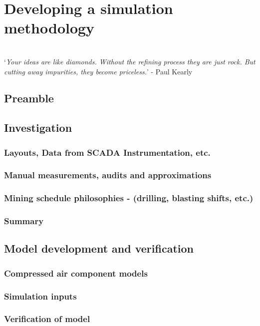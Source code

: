 \chapter{Developing a simulation methodology}
\vspace{38em}

\hrulefill
\\
\enquote*{\textit{Your ideas are like diamonds. Without the refining process they are just rock. But cutting away impurities, they become priceless.}} - Paul Kearly\\
\newpage
\section{Preamble}
\section{Investigation}
	\subsection{Layouts, Data from SCADA Instrumentation, etc.}
	\subsection{Manual measurements, audits and approximations}
	\subsection{Mining schedule philosophies \color{blue} - (drilling, blasting shifts, etc.)}
	\subsection{Summary}
\section{Model development and verification}
	\subsection{Compressed air component models}
	\subsection{Simulation inputs}
	\subsection{Verification of model}
